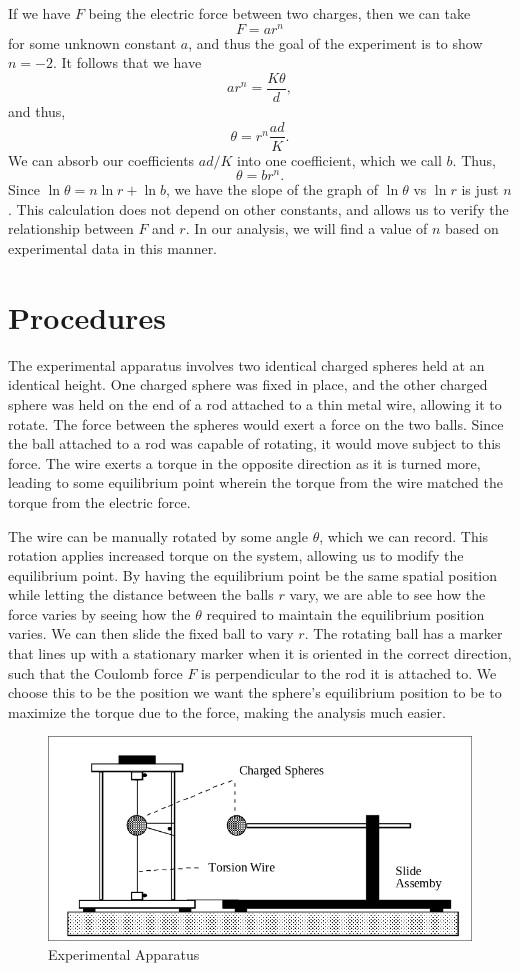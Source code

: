 \documentclass[11pt, letterpaper]{report}
\begin{document}
If we have $F$ being the electric force between two charges, then we can take
\[
	F=ar^n
\]
for some unknown constant $a$, and thus the goal of the experiment is to show $n=-2$. It follows that we have
\[
	ar^n=\frac{K\theta }{d}
,\]
and thus,
\[
	\theta =r^n \frac{ad}{K}
.\]
We can absorb our coefficients $ad/K$ into one coefficient, which we call $b$. Thus,
 \[
	\theta =br^n
.\]
Since $\ln \theta =n\ln r+\ln b$, we have the slope of the graph of $\ln \theta $ vs $\ln r$ is just $n$. This calculation does not depend on other constants, and allows us to verify the relationship between $F$ and $r$. In our analysis, we will find a value of $n$ based on experimental data in this manner.
\section{Procedures}
The experimental apparatus involves two identical charged spheres held at an identical height. One charged sphere was fixed in place, and the other charged sphere was held on the end of a rod attached to a thin metal wire, allowing it to rotate. The force between the spheres would exert a force on the two balls. Since the ball attached to a rod was capable of rotating, it would move subject to this force. The wire exerts a torque in the opposite direction as it is turned more, leading to some equilibrium point wherein the torque from the wire matched the torque from the electric force.

The wire can be manually rotated by some angle $\theta $, which we can record. This rotation applies increased torque on the system, allowing us to modify the equilibrium point. By having the equilibrium point be the same spatial position while letting the distance between the balls $r$ vary, we are able to see how the force varies by seeing how the $\theta $ required to maintain the equilibrium position varies. We can then slide the fixed ball to vary $r$. The rotating ball has a marker that lines up with a stationary marker when it is oriented in the correct direction, such that the Coulomb force $F$ is perpendicular to the rod it is attached to. We choose this to be the position we want the sphere's equilibrium position to be to maximize the torque due to the force, making the analysis much easier.
\begin{center}
	\begin{figure}[ht]
	\includegraphics[scale=0.5]{../figures/experiment.png}
	\centering
	\caption{Experimental Apparatus}\label{fig:1}
\end{figure}
\end{center}
\end{document}
